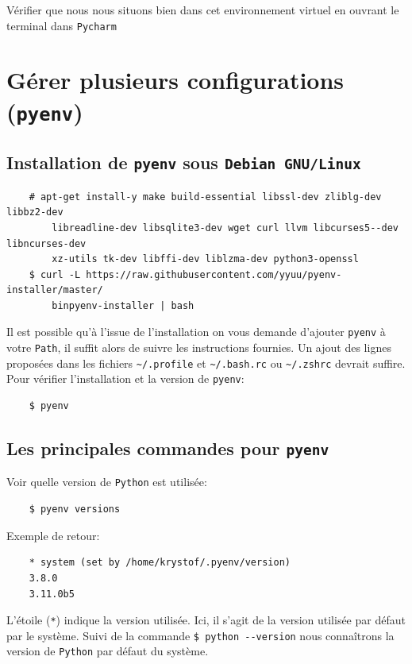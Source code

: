 \documentclass[a4paper,11pt]{book}
\begin{document}
Vérifier que nous nous situons bien dans cet environnement virtuel en ouvrant le terminal dans \texttt{Pycharm}
\medskip

\section{Gérer plusieurs configurations (\texttt{pyenv})}
\subsection*{Installation de \texttt{pyenv} sous \texttt{Debian GNU/Linux}}
\begin{verbatim}
    # apt-get install-y make build-essential libssl-dev zliblg-dev libbz2-dev 
    	libreadline-dev libsqlite3-dev wget curl llvm libcurses5--dev libncurses-dev 
    	xz-utils tk-dev libffi-dev liblzma-dev python3-openssl
    $ curl -L https://raw.githubusercontent.com/yyuu/pyenv-installer/master/
    	binpyenv-installer | bash
\end{verbatim}
\medskip

Il est possible qu'à l'issue de l'installation on vous demande d'ajouter \texttt{pyenv} à votre \texttt{Path}, il suffit alors de suivre les instructions fournies. Un ajout des lignes proposées dans les fichiers \verb|~/.profile| et \verb|~/.bash.rc| ou \verb|~/.zshrc| devrait suffire. Pour vérifier l'installation et la version de \texttt{pyenv}:
\begin{verbatim}
    $ pyenv
\end{verbatim}
\medskip

\subsection*{Les principales commandes pour \texttt{pyenv}}
Voir quelle version de \texttt{Python} est utilisée:
\begin{verbatim}
    $ pyenv versions
\end{verbatim}
\medskip

Exemple de retour:
\begin{verbatim}
    * system (set by /home/krystof/.pyenv/version)
    3.8.0
    3.11.0b5
\end{verbatim}
\medskip

L'étoile (\texttt{*}) indique la version utilisée. Ici, il s'agit de la version utilisée par défaut par le système. Suivi de la commande \verb|$ python --version| nous connaîtrons la version de \texttt{Python} par défaut du système.
\medskip
\end{document}
